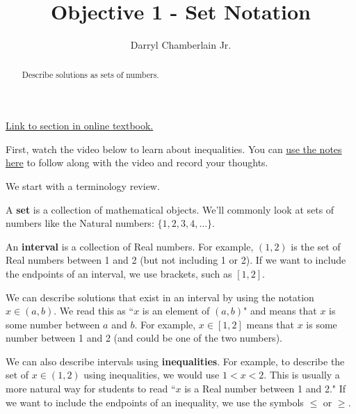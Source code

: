 \documentclass{ximera}
\author{Darryl Chamberlain Jr.}
\title{Objective 1 - Set Notation}
\begin{document}
\begin{abstract}
Describe solutions as sets of numbers. 
\end{abstract}
\maketitle

\href{https://cnx.org/contents/mwjClAV_@8.1:uIjtHMfW@9/Linear-Inequalities-and-Absolute-Value-Inequalities}{Link to section in online textbook.}

First, watch the video below to learn about inequalities. You can \href{}{use the notes here} to follow along with the video and record your thoughts.

\youtube{}


We start with a terminology review. 

A \textbf{set} is a collection of mathematical objects. We'll commonly look at sets of numbers like the Natural numbers: $\{ 1, 2, 3, 4, \ldots \}$. 

An \textbf{interval} is a collection of Real numbers. For example, $(1, 2)$ is the set of Real numbers between 1 and 2 (but not including 1 or 2). If we want to include the endpoints of an interval, we use brackets, such as $[1, 2]$. 

We can describe solutions that exist in an interval by using the notation $x \in (a, b)$. We read this as ``$x$ is an element of $(a, b)$" and means that $x$ is some number between $a$ and $b$. For example, $x \in [1, 2]$ means that $x$ is some number between 1 and 2 (and could be one of the two numbers). 

We can also describe intervals using \textbf{inequalities}. For example, to describe the set of $x \in (1, 2)$ using inequalities, we would use $1 < x < 2$. This is usually a more natural way for students to read ``$x$ is a Real number between 1 and 2." If we want to include the endpoints of an inequality, we use the symbols $\leq$ or $\geq$. 
\end{document}
